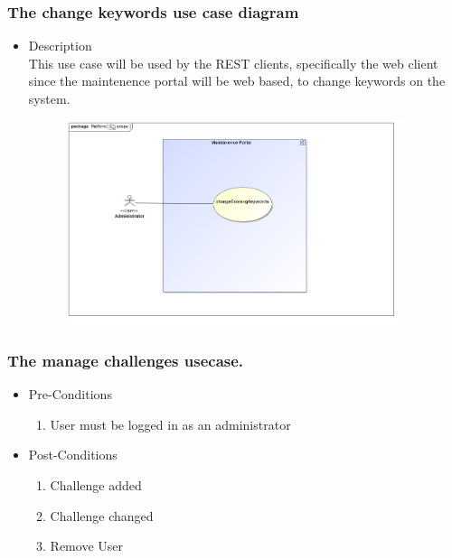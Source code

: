 \documentclass[english]{article}
\begin{document}
		
		
		
		
		\subsubsection* {The change keywords use case diagram}
		\begin{itemize}
			\item Description\\
			This use case will be used by the REST clients, specifically the web client since the maintenence portal will be web based, to change keywords on the system.
		\end{itemize}
		\includegraphics[width=14cm,height=6cm,keepaspectratio]{keyWords.jpg}	
		
		
			\subsubsection{The manage challenges usecase.}
			
			\begin{itemize}
				
				
				\item Pre-Conditions
				\begin{enumerate}
					\item User must be logged in as an administrator
				\end{enumerate}
				\item Post-Conditions
				\begin{enumerate}
					\item Challenge added
					\item Challenge changed
					\item Remove User
					
				\end{enumerate}
				
				
			\end{itemize}	
			
\end{document}
